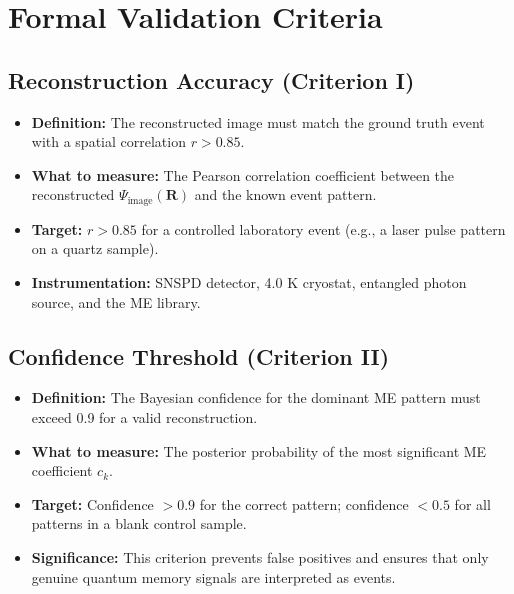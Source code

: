 \documentclass[12pt]{article}
\begin{document}
\section{Formal Validation Criteria}

\subsection{Reconstruction Accuracy (Criterion I)}
\begin{itemize}
    \item \textbf{Definition:} The reconstructed image must match the ground truth event with a spatial correlation $r > 0.85$.
    \item \textbf{What to measure:} The Pearson correlation coefficient between the reconstructed $\Psi_{\text{image}}(\mathbf{R})$ and the known event pattern.
    \item \textbf{Target:} $r > 0.85$ for a controlled laboratory event (e.g., a laser pulse pattern on a quartz sample).
    \item \textbf{Instrumentation:} SNSPD detector, 4.0 K cryostat, entangled photon source, and the ME library.
\end{itemize}

\subsection{Confidence Threshold (Criterion II)}
\begin{itemize}
    \item \textbf{Definition:} The Bayesian confidence for the dominant ME pattern must exceed 0.9 for a valid reconstruction.
    \item \textbf{What to measure:} The posterior probability of the most significant ME coefficient $c_k$.
    \item \textbf{Target:} Confidence $> 0.9$ for the correct pattern; confidence $< 0.5$ for all patterns in a blank control sample.
    \item \textbf{Significance:} This criterion prevents false positives and ensures that only genuine quantum memory signals are interpreted as events.
\end{itemize}
\end{document}
